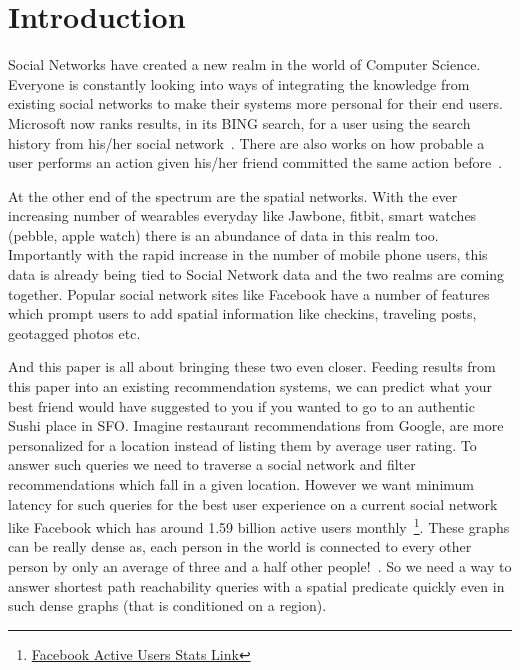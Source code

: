 \section{Introduction}
Social Networks have created a new realm in the world of Computer Science. Everyone is constantly looking into ways of integrating the knowledge from existing social networks to make their systems more personal for their end users. Microsoft now ranks results, in its BING search, for a user using the search history from his/her social network~\cite{M2011}. There are also works on how probable a user performs an action given his/her friend committed the same action before~\cite{DJE2003}. 

At the other end of the spectrum are the spatial networks. With the ever increasing number of wearables everyday like Jawbone, fitbit, smart watches (pebble, apple watch) there is an abundance of data in this realm too. Importantly with the rapid increase in the number of mobile phone users, this data is already being tied to Social Network data and the two realms are coming together. Popular social network sites like Facebook have a number of features which prompt users to add spatial information like checkins, traveling posts, geotagged photos etc.

And this paper is all about bringing these two even closer. Feeding results from this paper into an existing recommendation systems, we can predict what your best friend would have suggested to you if you wanted to go to an authentic Sushi place in SFO. Imagine restaurant recommendations from Google, are more personalized for a location instead of listing them by average user rating. To answer such queries we need to traverse a social network and filter recommendations which fall in a given location. However we want minimum latency for such queries for the best user experience on a current social network like Facebook which has around 1.59 billion active users monthly~\footnote{\href{http://www.statista.com/statistics/264810/number-of-monthly-active-facebook-users-worldwide/}{Facebook Active Users Stats Link}}. These graphs can be really dense as, each person in the world is connected to every other person by only an average of three and a half other people!~\cite{Taa}. So we need a way to answer shortest path reachability queries with a spatial predicate quickly even in such dense graphs (that is conditioned on a region).

